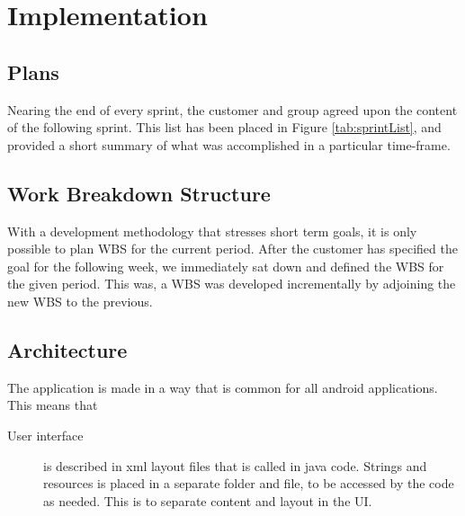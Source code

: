 \chapter{Implementation}
\section{Plans}

Nearing the end of every sprint, the customer and group agreed upon the content of the following sprint. This list has been placed in Figure \ref{tab:sprintList}, and provided a short summary of what was accomplished in a particular time-frame. 

\section{Work Breakdown Structure}
With a development methodology that stresses short term goals, it is only possible to plan WBS for the current period. After the customer has specified the goal for the following week, we immediately sat down and defined the WBS for the given period. This was, a WBS was developed incrementally by adjoining the new WBS to the previous.

\section{Architecture}
The application is made in a way that is common for all android applications. This means that
\begin{description}
\item[User interface] is described in xml layout files that is called in java code. Strings and resources is placed in a separate folder and file, to be accessed by the code as needed. This is to separate content and layout in the UI.
\end{description}





 





